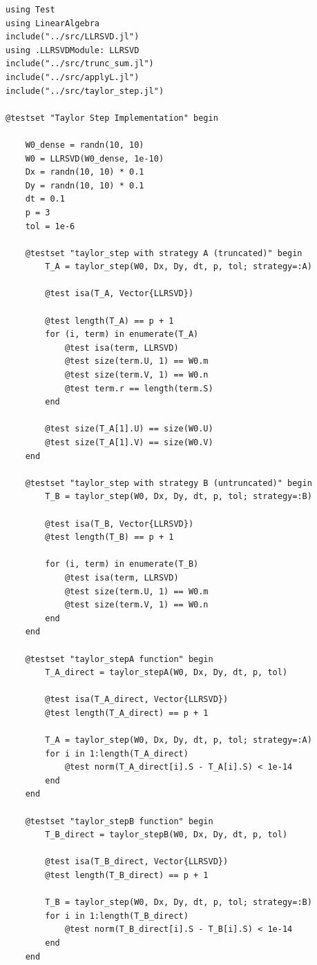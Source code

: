 \documentclass[11pt]{article}
\begin{document}
\begin{lstlisting}
using Test
using LinearAlgebra
include("../src/LLRSVD.jl")
using .LLRSVDModule: LLRSVD
include("../src/trunc_sum.jl")
include("../src/applyL.jl")
include("../src/taylor_step.jl")

@testset "Taylor Step Implementation" begin
    
    W0_dense = randn(10, 10)
    W0 = LLRSVD(W0_dense, 1e-10)
    Dx = randn(10, 10) * 0.1
    Dy = randn(10, 10) * 0.1
    dt = 0.1
    p = 3
    tol = 1e-6

    @testset "taylor_step with strategy A (truncated)" begin
        T_A = taylor_step(W0, Dx, Dy, dt, p, tol; strategy=:A)
        
        @test isa(T_A, Vector{LLRSVD})
        
        @test length(T_A) == p + 1
        for (i, term) in enumerate(T_A)
            @test isa(term, LLRSVD)
            @test size(term.U, 1) == W0.m
            @test size(term.V, 1) == W0.n
            @test term.r == length(term.S)
        end
        
        @test size(T_A[1].U) == size(W0.U)
        @test size(T_A[1].V) == size(W0.V)
    end

    @testset "taylor_step with strategy B (untruncated)" begin
        T_B = taylor_step(W0, Dx, Dy, dt, p, tol; strategy=:B)
        
        @test isa(T_B, Vector{LLRSVD})
        @test length(T_B) == p + 1
        
        for (i, term) in enumerate(T_B)
            @test isa(term, LLRSVD)
            @test size(term.U, 1) == W0.m
            @test size(term.V, 1) == W0.n
        end
    end

    @testset "taylor_stepA function" begin
        T_A_direct = taylor_stepA(W0, Dx, Dy, dt, p, tol)
        
        @test isa(T_A_direct, Vector{LLRSVD})
        @test length(T_A_direct) == p + 1
        
        T_A = taylor_step(W0, Dx, Dy, dt, p, tol; strategy=:A)
        for i in 1:length(T_A_direct)
            @test norm(T_A_direct[i].S - T_A[i].S) < 1e-14
        end
    end

    @testset "taylor_stepB function" begin
        T_B_direct = taylor_stepB(W0, Dx, Dy, dt, p, tol)
        
        @test isa(T_B_direct, Vector{LLRSVD})
        @test length(T_B_direct) == p + 1
        
        T_B = taylor_step(W0, Dx, Dy, dt, p, tol; strategy=:B)
        for i in 1:length(T_B_direct)
            @test norm(T_B_direct[i].S - T_B[i].S) < 1e-14
        end
    end


\end{lstlisting}
\end{document}
